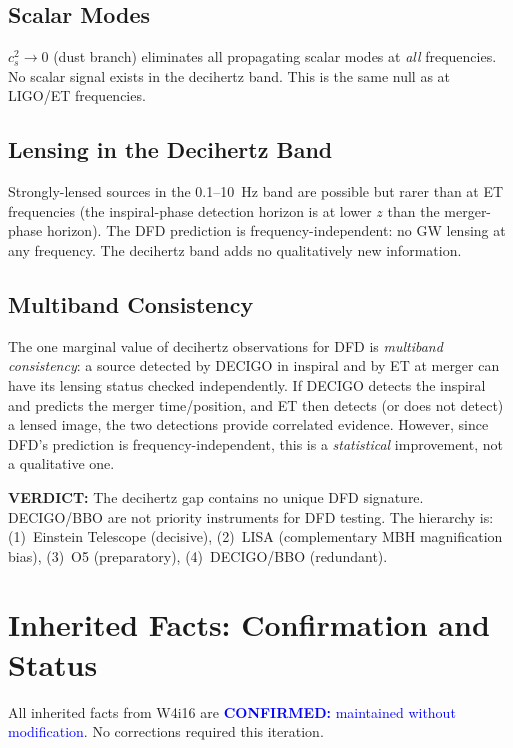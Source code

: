 \documentclass[11pt]{article}
\theoremstyle{definition}
\theoremstyle{remark}
\newcommand{\confirmed}[1]{\textcolor{blue}{\textbf{CONFIRMED:} #1}}
\newcommand{\verdict}[1]{\textcolor{green!50!black}{\textbf{VERDICT:} #1}}
\begin{document}
\subsection{Scalar Modes}

$c_s^2 \to 0$ (dust branch) eliminates all propagating scalar modes
at \emph{all} frequencies. No scalar signal exists in the decihertz
band. This is the same null as at LIGO/ET frequencies.

\subsection{Lensing in the Decihertz Band}

Strongly-lensed sources in the 0.1--10~Hz band are possible but rarer
than at ET frequencies (the inspiral-phase detection horizon is at
lower $z$ than the merger-phase horizon). The DFD prediction is
frequency-independent: no GW lensing at any frequency. The decihertz
band adds no qualitatively new information.

\subsection{Multiband Consistency}

The one marginal value of decihertz observations for DFD is
\emph{multiband consistency}: a source detected by DECIGO in inspiral
and by ET at merger can have its lensing status checked independently.
If DECIGO detects the inspiral and predicts the merger time/position,
and ET then detects (or does not detect) a lensed image, the two
detections provide correlated evidence. However, since DFD's prediction
is frequency-independent, this is a \emph{statistical} improvement,
not a qualitative one.

\verdict{The decihertz gap contains no unique DFD signature. DECIGO/BBO
are not priority instruments for DFD testing. The hierarchy is:
(1)~Einstein Telescope (decisive), (2)~LISA (complementary MBH
magnification bias), (3)~O5 (preparatory), (4)~DECIGO/BBO (redundant).}


\section*{Inherited Facts: Confirmation and Status}

All inherited facts from W4i16 are \confirmed{maintained without
modification}. No corrections required this iteration.
\end{document}
